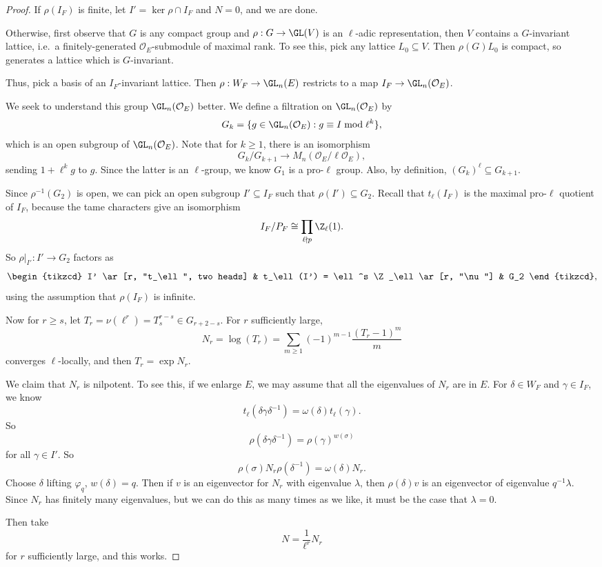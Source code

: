 \documentclass[a4paper]{article}
\begin{document}
\begin{proof}
  If $\rho(I_F)$ is finite, let $I' = \ker \rho \cap I_F$ and $N = 0$, and we are done.

  Otherwise, first observe that $G$ is any compact group and $\rho: G \to \GL(V)$ is an $\ell$-adic representation, then $V$ contains a $G$-invariant lattice, i.e.\ a finitely-generated $\mathcal{O}_E$-submodule of maximal rank. To see this, pick any lattice $L_0 \subseteq V$. Then $\rho(G) L_0$ is compact, so generates a lattice which is $G$-invariant.

  Thus, pick a basis of an $I_F$-invariant lattice. Then $\rho: W_F \to \GL_n(E)$ restricts to a map $I_F \to \GL_n(\mathcal{O}_E)$.

  We seek to understand this group $\GL_n(\mathcal{O}_E)$ better. We define a filtration on $\GL_n(\mathcal{O}_E)$ by
  \[
    G_k = \{g \in \GL_n(\mathcal{O}_E) : g \equiv I \bmod \ell^k \},
  \]
  which is an open subgroup of $\GL_n(\mathcal{O}_E)$. Note that for $k \geq 1$, there is an isomorphism
   \[
    G_k/G_{k + 1} \to M_n(\mathcal{O}_E/\ell \mathcal{O}_E),
  \]
  sending $1 + \ell^k g$ to $g$. Since the latter is an $\ell$-group, we know $G_1$ is a pro-$\ell$ group. Also, by definition, $(G_k)^\ell \subseteq G_{k + 1}$.

  Since $\rho^{-1}(G_2)$ is open, we can pick an open subgroup $I' \subseteq I_F$ such that $\rho(I') \subseteq G_2$. Recall that $t_\ell(I_F)$ is the maximal pro-$\ell$ quotient of $I_F$, because the tame characters give an isomorphism
  \[
    I_F/P_F \cong \prod_{\ell \nmid p} \Z_\ell(1).
  \]
  So $\rho|_{I'}: I' \to G_2$ factors as
  \[
    \begin{tikzcd}
      I' \ar[r, "t_\ell", two heads] & t_\ell(I') = \ell^s \Z_\ell \ar[r, "\nu"] & G_2
    \end{tikzcd},
  \]
  using the assumption that $\rho(I_F)$ is infinite.

  Now for $r \geq s$, let $T_r = \nu(\ell^r) = T_s^{r - s} \in G_{r + 2 - s}$. For $r$ sufficiently large,
  \[
    N_r = \log (T_r) = \sum_{m \geq 1} (-1)^{m - 1} \frac{(T_r - 1)^m}{m}
  \]
  converges $\ell$-locally, and then $T_r = \exp N_r$.

  We claim that $N_r$ is nilpotent. To see this, if we enlarge $E$, we may assume that all the eigenvalues of $N_r$ are in $E$. For $\delta \in W_F$ and $\gamma \in I_F$, we know
  \[
    t_\ell(\delta \gamma \delta^{-1}) = \omega(\delta) t_\ell(\gamma).
  \]
  So
  \[
    \rho(\delta \gamma \delta^{-1}) = \rho(\gamma)^{w(\sigma)}
  \]
  for all $\gamma \in I'$. So
  \[
    \rho(\sigma) N_r \rho(\delta^{-1}) = \omega(\delta) N_r.
  \]
  Choose $\delta$ lifting $\varphi_q$, $w(\delta) = q$. Then if $v$ is an eigenvector for $N_r$ with eigenvalue $\lambda$, then $\rho(\delta)v$ is an eigenvector of eigenvalue $q^{-1}\lambda$. Since $N_r$ has finitely many eigenvalues, but we can do this as many times as we like, it must be the case that $\lambda = 0$.

  Then take
  \[
    N = \frac{1}{\ell^r} N_r
  \]
  for $r$ sufficiently large, and this works.
\end{proof}
\end{document}
